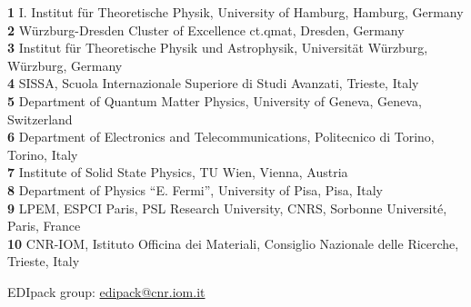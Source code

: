 \documentclass[dvipsnames]{SciPost}
\begin{document}
\begin{center}
%
%
  \newcommand{\CNRIOM}{CNR-IOM, Istituto Officina dei Materiali,
  Consiglio Nazionale delle Ricerche, Trieste, Italy}
\newcommand{\SISSA}{SISSA, Scuola Internazionale Superiore di Studi Avanzati, Trieste, Italy}
\newcommand{\ITPHamburg}{I. Institut f\"ur Theoretische Physik,
  University of Hamburg, Hamburg, Germany}
\newcommand{\WZBURG}{Institut f\"ur Theoretische Physik und
  Astrophysik, Universit\"at W\"urzburg, W\"urzburg, Germany}
\newcommand{\CTQMAT}{W\"urzburg-Dresden Cluster of Excellence ct.qmat, Dresden, Germany}
\newcommand{\Geneve}{Department of Quantum Matter Physics, University of
  Geneva, Geneva, Switzerland}
\newcommand{\UPISA}{Department of Physics ``E. Fermi'', University of
  Pisa, Pisa, Italy}
\newcommand{\ESPCI}{LPEM, ESPCI Paris, PSL Research University, CNRS, Sorbonne Universit\'e, Paris, France}
\newcommand{\TUW}{Institute of Solid State Physics, TU Wien, Vienna, Austria}
\newcommand{\ToPoli}{Department of Electronics and Telecommunications, Politecnico di Torino, Torino, Italy}
{\small
{\bf 1} \ITPHamburg\\
{\bf 2} \CTQMAT\\
{\bf 3} \WZBURG\\
{\bf 4} \SISSA\\
{\bf 5} \Geneve\\
{\bf 6} \ToPoli\\
{\bf 7} \TUW\\   
{\bf 8} \UPISA\\
{\bf 9} \ESPCI\\
{\bf 10} \CNRIOM\\
}
\end{center}



\begin{center}
EDIpack group: \href{mailto:edipack@cnr.iom.it}{\small edipack@cnr.iom.it}
\end{center}



\end{document}
